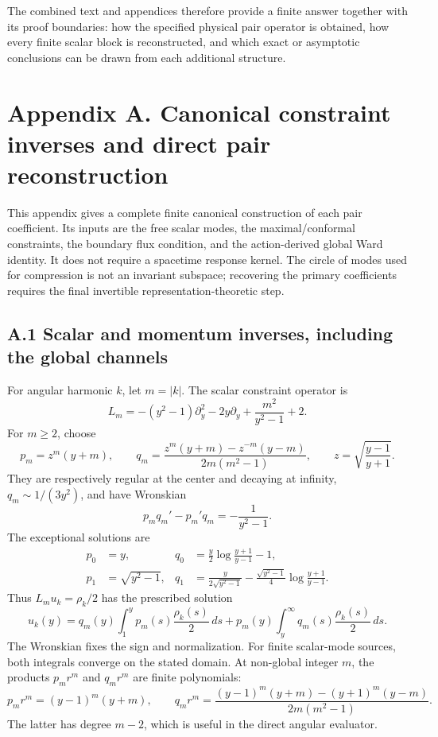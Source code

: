 \documentclass[a4paper,11pt]{article}
\numberwithin{equation}{section}
\begin{document}
The combined text and appendices therefore provide a finite answer together with its proof boundaries: how the specified physical pair operator is obtained, how every finite scalar block is reconstructed, and which exact or asymptotic conclusions can be drawn from each additional structure.

\clearpage
\hypertarget{appendix-a.-canonical-constraint-inverses-and-direct-pair-reconstruction}{%
\section{Appendix A. Canonical constraint inverses and direct pair reconstruction}\label{appendix-a.-canonical-constraint-inverses-and-direct-pair-reconstruction}}

This appendix gives a complete finite canonical construction of each pair coefficient. Its inputs are the free scalar modes, the maximal/conformal constraints, the boundary flux condition, and the action-derived global Ward identity. It does not require a spacetime response kernel. The circle of modes used for compression is not an invariant subspace; recovering the primary coefficients requires the final invertible representation-theoretic step.

\hypertarget{a.1-scalar-and-momentum-inverses-including-the-global-channels}{%
\subsection{A.1 Scalar and momentum inverses, including the global channels}\label{a.1-scalar-and-momentum-inverses-including-the-global-channels}}

For angular harmonic \(k\), let \(m=|k|\). The scalar constraint operator is \[
L_m=-(y^2-1)\partial_y^2-2y\partial_y+\frac{m^2}{y^2-1}+2 .
\tag{A.1}
\] For \(m\ge2\), choose \[
p_m=z^m(y+m),\qquad
q_m=\frac{z^m(y+m)-z^{-m}(y-m)}{2m(m^2-1)},
\qquad z=\sqrt{\frac{y-1}{y+1}}.
\tag{A.2}
\] They are respectively regular at the center and decaying at infinity, \(q_m\sim1/(3y^2)\), and have Wronskian \[
p_mq_m'-p_m'q_m=-\frac1{y^2-1}.
\] The exceptional solutions are \[
\begin{aligned}
p_0&=y,&q_0&=\frac y2\log\frac{y+1}{y-1}-1,\\
p_1&=\sqrt{y^2-1},&
q_1&=\frac{y}{2\sqrt{y^2-1}}
-\frac{\sqrt{y^2-1}}4\log\frac{y+1}{y-1}.
\end{aligned}
\tag{A.3}
\] Thus \(L_mu_k=\rho_k/2\) has the prescribed solution \[
u_k(y)=q_m(y)\int_1^y p_m(s)\frac{\rho_k(s)}2\,ds
+p_m(y)\int_y^\infty q_m(s)\frac{\rho_k(s)}2\,ds.
\tag{A.4}
\] The Wronskian fixes the sign and normalization. For finite scalar-mode sources, both integrals converge on the stated domain. At non-global integer \(m\), the products \(p_mr^m\) and \(q_mr^m\) are finite polynomials: \[
p_mr^m=(y-1)^m(y+m),\qquad
q_mr^m=\frac{(y-1)^m(y+m)-(y+1)^m(y-m)}
{2m(m^2-1)}.
\tag{A.5}
\] The latter has degree \(m-2\), which is useful in the direct angular evaluator.
\end{document}
